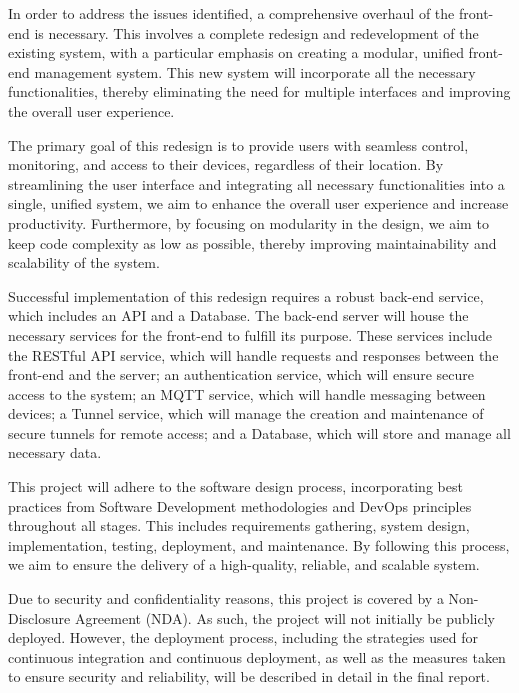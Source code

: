 


In order to address the issues identified, 
a comprehensive overhaul of the front-end is necessary. 
This involves a complete redesign and redevelopment of the existing system, 
with a particular emphasis on creating a modular, 
unified front-end management system. 
This new system will incorporate all the necessary functionalities, 
thereby eliminating the need for multiple interfaces and improving the overall user experience.

The primary goal of this redesign is to provide users with seamless control, 
monitoring, and access to their devices, 
regardless of their location. 
By streamlining the user interface and integrating all necessary functionalities into a single, 
unified system, we aim to enhance the overall user experience and increase productivity. 
Furthermore, by focusing on modularity in the design, 
we aim to keep code complexity as low as possible, 
thereby improving maintainability and scalability of the system.

Successful implementation of this redesign requires a robust back-end service, which includes an API and a Database. The back-end server will house the necessary services for the front-end to fulfill its purpose. These services include the RESTful API service, which will handle requests and responses between the front-end and the server; an authentication service, which will ensure secure access to the system; an MQTT service, which will handle messaging between devices; a Tunnel service, which will manage the creation and maintenance of secure tunnels for remote access; and a Database, which will store and manage all necessary data.

This project will adhere to the software design process, incorporating best practices from Software Development methodologies and DevOps principles throughout all stages. This includes requirements gathering, system design, implementation, testing, deployment, and maintenance. By following this process, we aim to ensure the delivery of a high-quality, reliable, and scalable system.

Due to security and confidentiality reasons, this project is covered by a Non-Disclosure Agreement (NDA). As such, the project will not initially be publicly deployed. However, the deployment process, including the strategies used for continuous integration and continuous deployment, as well as the measures taken to ensure security and reliability, will be described in detail in the final report.